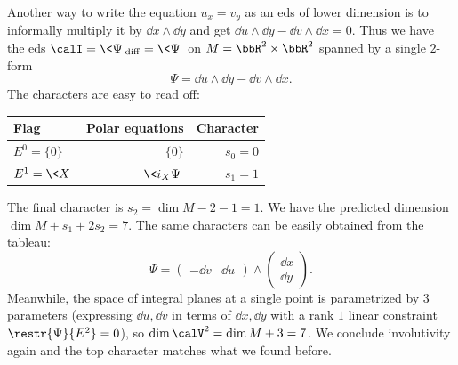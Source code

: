 \begin{example}\label{ex ux=vy 2}
    Another way to write the equation $u_x=v_y$ as an \gls{eds} of lower dimension is to informally multiply it by $\dd x\wedge\dd y$ and get $\dd u\wedge\dd y-\dd v\wedge\dd x=0$. Thus we have the \gls{eds} $\calI=\<\Psi\>_{\mathrm{diff}}=\<\Psi\>$ on $M=\bbR^2\times\bbR^2$ spanned by a single $2$-form 
    \[\Psi=\dd u\wedge\dd y-\dd v\wedge\dd x.\]
    The characters are easy to read off: 
    \begin{center}
        \begin{tabular}{l r r} 
         Flag & Polar equations & Character \\ [0.5ex] 
         \hline
         $E^0=\{0\}$ & $\{0\}$ & $s_0=0$ \\ 
         $E^1=\<X\>$ & $\<i_X\Psi\>$ & $s_1=1$ \\
         \hline
        \end{tabular}
    \end{center}

    The final character is $s_2=\dim M-2-1=1$. We have the predicted dimension $\dim M+s_1+2s_2=7$. The same characters can be easily obtained from the tableau:
    \[\Psi=
    \begin{pmatrix}
        -\dd v & \dd u
    \end{pmatrix}\wedge 
    \begin{pmatrix}
        \dd x\\ \dd y
    \end{pmatrix}.
    \]
    Meanwhile, the space of integral planes at a single point is parametrized by $3$ parameters (expressing $\dd u,\dd v$ in terms of $\dd x,\dd y$ with a rank $1$ linear constraint $\restr{\Psi}{E^2}=0$), so $\dim\calV^2=\dim M+3=7$. We conclude involutivity again and the top character matches what we found before.
\end{example}


